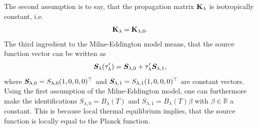 \documentclass[a4paper,12pt]{report}
\begin{document}
The second assumption is to say, that the propagation matrix $\boldsymbol{\mathbf{K}}_\lambda$ is isotropically constant, i.e. \begin{equation}
\boldsymbol{\mathbf{K}}_\lambda = \boldsymbol{\mathbf{K}}_{\lambda,0}.
\end{equation} The third ingredient to the Milne-Eddington model means, that the source function vector can be written as \begin{equation}
\bm{S}_\lambda(\tau_\lambda^\prime) = \bm{S}_{\lambda,0} + \tau_\lambda^\prime \bm{S}_{\lambda,1},
\end{equation} where $\bm{S}_{\lambda,0} = S_{\lambda,0}(1,0,0,0)^\top$ and $\bm{S}_{\lambda,1}=S_{\lambda,1}(1,0,0,0)^\top$ are constant vectors. Using the first assumption of the Milne-Eddington model, one can furthermore make the identifications $S_{\lambda,0} = B_\lambda(T)$ and $S_{\lambda,1} = B_\lambda(T)\beta$ with $\beta \in \mathbb{R}$ a constant. This is because local thermal equilibrium implies, that the source function is locally equal to the Planck function.
\end{document}
